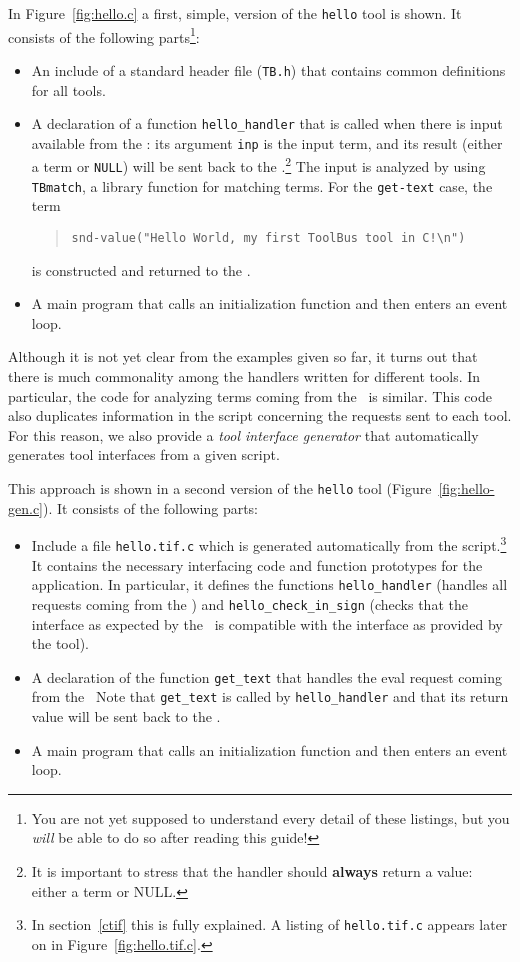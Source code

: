 In Figure~\ref{fig:hello.c} a first, simple, version of the {\tt hello} tool
is shown. It consists of the following parts\footnote{
You are not yet supposed to understand every detail of these
listings, but you {\em will} be able to do so after reading this guide!}:
\begin{itemize}
\item An include of a standard header file ({\tt TB.h}) that contains
common definitions for all tools.
\item A declaration of a function {\tt hello\_handler} that is called when there is
input available from the \TB:
its argument {\tt inp} is the input term, and its result (either a term
or {\tt NULL}) will be sent back to the \TB.\footnote{It is important
to stress that the handler should {\bf always} return a value: 
either a term or NULL.}
The input is analyzed by using {\tt TBmatch}, a library function for matching
terms. For the {\tt get-text} case, 
the term
\begin{quote}
\verb+snd-value("Hello World, my first ToolBus tool in C!\n")+
\end{quote}
is constructed and returned to the \TB.

\item A main program that calls an initialization function and
then enters an event loop.

\end{itemize}

Although it is not yet clear from the examples given so far,
it turns out that there is much commonality among the handlers
written for different tools. In particular, the code for analyzing
terms coming from the \TB\ is similar. This code also duplicates
information in the script concerning the requests sent to each tool.
For this reason, we also provide a {\em tool interface generator}
that automatically generates tool interfaces from a given script.

This approach is shown in a second version of
the {\tt hello} tool (Figure~\ref{fig:hello-gen.c}).
It consists of the following parts:
\begin{itemize}
\item Include a file {\tt hello.tif.c} which is generated automatically
from the script.\footnote{In section~\ref{ctif} this is fully explained.
A listing of {\tt hello.tif.c} appears later on in Figure~\ref{fig:hello.tif.c}.}
It contains the necessary interfacing code and
function prototypes for the application.
In particular, it defines the functions
{\tt hello\_handler} (handles all requests coming from
the \TB) and {\tt hello\_check\_in\_sign} (checks
that the interface as expected by the \TB\ is compatible with the
interface as provided by the tool).

\item A declaration of the function {\tt get\_text} that handles the
eval request coming from the \TB\ 
Note that {\tt get\_text} is called by {\tt hello\_handler} and that
its return value will be sent back to the \TB.

\item A main program that calls an initialization function and
then enters an event loop.

\end{itemize}


